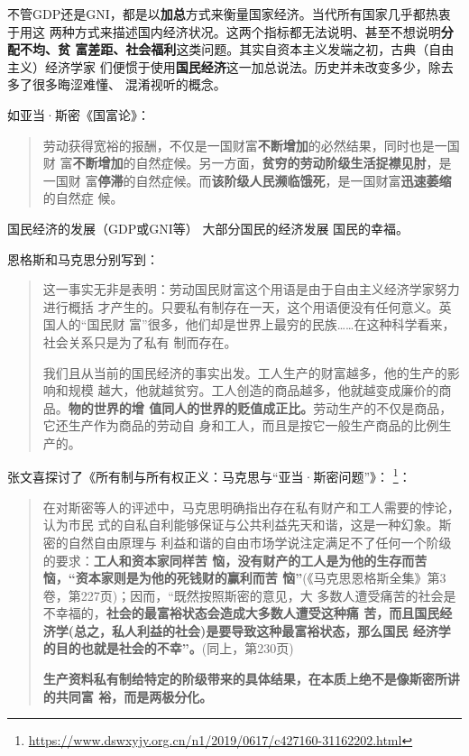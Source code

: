 不管GDP还是GNI，都是以\textbf{加总}方式来衡量国家经济。当代所有国家几乎都热衷于用这
两种方式来描述国内经济状况。这两个指标都无法说明、甚至不想说明\textbf{分配不均、贫
  富差距、社会福利}这类问题。其实自资本主义发端之初，古典（自由主义）经济学家
们便惯于使用\textbf{国民经济}这一加总说法。历史并未改变多少，除去多了很多晦涩难懂、
混淆视听的概念。

如亚当·斯密《国富论》：
\begin{quotation}
  劳动获得宽裕的报酬，不仅是一国财富\textbf{不断增加}的必然结果，同时也是一国财
  富\textbf{不断增加}的自然症候。另一方面，\textbf{贫穷的劳动阶级生活捉襟见肘}，是一国财
  富\textbf{停滞}的自然症候。而\textbf{该阶级人民濒临饿死}，是一国财富\textbf{迅速萎缩}的自然症
  候。
\end{quotation}


国民经济的发展（GDP或GNI等） \neq 大部分国民的经济发展 \neq 国民的幸福。

恩格斯和马克思分别写到：
\begin{quotation}
  这一事实无非是表明：劳动国民财富这个用语是由于自由主义经济学家努力进行概括
  才产生的。只要私有制存在一天，这个用语便没有任何意义。英国人的“国民财
  富”很多，他们却是世界上最穷的民族……在这种科学看来，社会关系只是为了私有
  制而存在。\cite[60]{maenwen1}

  我们且从当前的国民经济的事实出发。工人生产的财富越多，他的生产的影响和规模
  越大，他就越贫穷。工人创造的商品越多，他就越变成廉价的商品。\textbf{物的世界的增
    值同人的世界的贬值成正比。}劳动生产的不仅是商品，它还生产作为商品的劳动自
  身和工人，而且是按它一般生产商品的比例生产的。\cite[156]{maenwen1}
\end{quotation}

张文喜探讨了《所有制与所有权正义：马克思与“亚当·斯密问题”》\cite{ZXYJ201404002}：
\footnote{\url{https://www.dswxyjy.org.cn/n1/2019/0617/c427160-31162202.html}}：
\begin{quotation}
  在对斯密等人的评述中，马克思明确指出存在私有财产和工人需要的悖论，认为市民
  式的自私自利能够保证与公共利益先天和谐，这是一种幻象。斯密的自然自由原理与
  利益和谐的自由市场学说注定满足不了任何一个阶级的要求：\textbf{工人和资本家同样苦
    恼，没有财产的工人是为他的生存而苦恼，“资本家则是为他的死钱财的赢利而苦
    恼”}(《马克思恩格斯全集》第3卷，第227页)；因而，“既然按照斯密的意见，大
  多数人遭受痛苦的社会是不幸福的，\textbf{社会的最富裕状态会造成大多数人遭受这种痛
    苦，而且国民经济学(总之，私人利益的社会)是要导致这种最富裕状态，那么国民
    经济学的目的也就是社会的不幸”。}(同上，第230页)

  \textbf{生产资料私有制给特定的阶级带来的具体结果，在本质上绝不是像斯密所讲的共同富
  裕，而是两极分化。}
\end{quotation}


